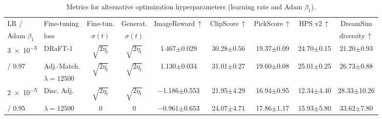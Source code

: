 \begin{table}[h!]
\centering
{\footnotesize
\begin{tabular}{llccccccc}
    \toprule
    LR / & Fine-tuning & Fine-tun. & Generat. & \multirow{2}{*}{ImageReward$\, \uparrow$} & \multirow{2}{*}{ClipScore$\, \uparrow$} & \multirow{2}{*}{PickScore$\, \uparrow$} & \multirow{2}{*}{HPS v2$\, \uparrow$} & DreamSim \\
    Adam $\beta_1$ & loss & $\sigma(t)$ & $\sigma(t)$ & & &  &  & diversity$\, \uparrow$ \\
    \midrule
    \num{3e-5} & DRaFT-1          & $\sqrt{2 \eta_t}$ & $\sqrt{2 \eta_t}$ & 1.467{\tiny$\pm$0.029} & 30.28{\tiny$\pm$0.56} & 19.37{\tiny$\pm$0.09} & 24.70{\tiny$\pm$0.15} & 21.20{\tiny$\pm$0.93} \\
    \addlinespace
    / \num{0.97} & Adj.-Match.  & \multirow{2}{*}{$\sqrt{2 \eta_t}$} & \multirow{2}{*}{$\sqrt{2 \eta_t}$} & \multirow{2}{*}{1.130{\tiny$\pm$0.034}} & \multirow{2}{*}{31.01{\tiny$\pm$0.27}} & \multirow{2}{*}{19.60{\tiny$\pm$0.08}} & \multirow{2}{*}{25.01{\tiny$\pm$0.25}} & \multirow{2}{*}{26.73{\tiny$\pm$0.88}} \\
    & $\lambda = 12500$                     &                                    &                 &  &  &  &  &  \\
    \midrule
    \num{2e-5} & Disc. Adj.  & $\sqrt{2 \eta_t}$ & $\sqrt{2 \eta_t}$ & $-$1.186{\tiny$\pm$0.553} & 21.95{\tiny$\pm$4.29} & 16.94{\tiny$\pm$0.95} & 12.34{\tiny$\pm$4.40} & 28.33{\tiny$\pm$10.26} \\
     / \num{0.95} & $\lambda = 12500$                     &  0                                  &  0               & $-$0.961{\tiny$\pm$0.653} & 24.07{\tiny$\pm$4.71} & 17.86{\tiny$\pm$1.17} & 15.93{\tiny$\pm$5.80} & 33.62{\tiny$\pm$7.80} \\
    \bottomrule
\end{tabular}
}
\caption{Metrics for alternative optimization hyperparameters (learning rate and Adam $\beta_1$). 
}
\label{table:alternative_hyperparameters}
\end{table}


